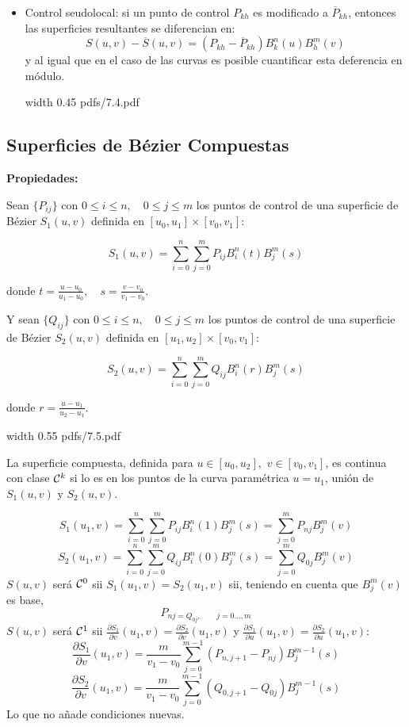 \documentclass[twoside]{report}
\newcommand{\colocapdf}[2]{\quad\pdfimage width #2 {pdfs/#1.pdf}}
\begin{document}
\begin{itemize}
\item Control seudolocal: si un punto de control $P_{kh}$ es modificado a $\overline{P}_{kh}$, entonces las superficies resultantes se diferencian en:
    $$S(u,v)-\overline{S}(u,v)=(P_{kh}-\overline{P}_{kh})B_k^n(u)B_h^m(v)$$
    y al igual que en el caso de las curvas es posible cuantificar esta deferencia en módulo.

\begin{center}
\colocapdf{7.4}{0.45\textwidth}
\end{center}
\end{itemize}

\subsection{Superficies de Bézier Compuestas}

{\bf Propiedades:}

Sean $\{P_{ij}\}$ con $0\leq i\leq n,\quad 0\leq j\leq m$ los puntos de control de una superficie de Bézier $S_1(u,v)$ definida en $[u_0,u_1] \times [v_0,v_1]$:

$$S_1(u,v)=\sum_{i=0}^n \sum_{j=0}^m P_{ij} B_i^n(t) B_j^m(s)$$

donde $t=\frac{u-u_0}{u_1-u_0},\quad s=\frac{v-v_0}{v_1-v_0}$.

\vspace{0.2cm}

Y sean $\{Q_{ij}\}$ con $0\leq i\leq n,\quad 0\leq j\leq m$ los puntos de control de una superficie de Bézier $S_2(u,v)$ definida en $[u_1,u_2] \times [v_0,v_1]$:

$$S_2(u,v)= \sum_{i=0}^n \sum_{j=0}^m Q_{ij} B_i^n(r) B_j^m(s)$$

donde $r=\frac{u-u_1}{u_2-u_1}.$

\begin{center}
\colocapdf{7.5}{0.55\textwidth}
\end{center}

La superficie compuesta, definida para $u\in [u_0,u_2],$ \quad $v\in [v_0,v_1]$, es continua con clase ${\cal C}^k$ si lo es en los puntos de la curva paramétrica $u=u_1$, unión de $S_1(u,v)$ y $S_2(u,v)$.

$$S_1(u_1,v)= \sum_{i=0}^n \sum_{j=0}^m P_{ij} B_i^n(1) B_j^m(s)=\sum_{j=0}^m P_{nj} B_j^m(v)$$
$$S_2(u_1,v)= \sum_{i=0}^n \sum_{j=0}^m Q_{ij} B_i^n(0) B_j^m(s)= \sum_{j=0}^m Q_{0j} B_j^m (v)$$
$S(u,v)$ será ${\cal C}^0$ sii $S_1(u_1,v)=S_2(u_1,v)$ sii, teniendo en cuenta que $B_j^m(v)$ es base,
$$P_{nj=Q_{0j},\quad \quad j=0\ldots,m}$$
$S(u,v)$ será ${\cal C}^1$ sii $\frac{\partial S_1}{\partial v} (u_1,v)=\frac{\partial S_2}{\partial v}(u_1,v)$  y $\frac{\partial S_1}{\partial u} (u_1,v)=\frac{\partial S_2}{\partial u}(u_1,v)$:
$$\frac{\partial S_1}{\partial v}(u_1,v)= \frac{m}{v_1-v_0} \sum_{j=0}^{m-1} (P_{n,j+1}-P_{nj}) B_j^{m-1}(s)$$
$$\frac{\partial S_2}{\partial v}(u_1,v)= \frac{m}{v_1-v_0} \sum_{j=0}^{m-1} (Q_{0,j+1}-Q_{0j}) B_j^{m-1}(s)$$
Lo que no añade condiciones nuevas.
\end{document}
